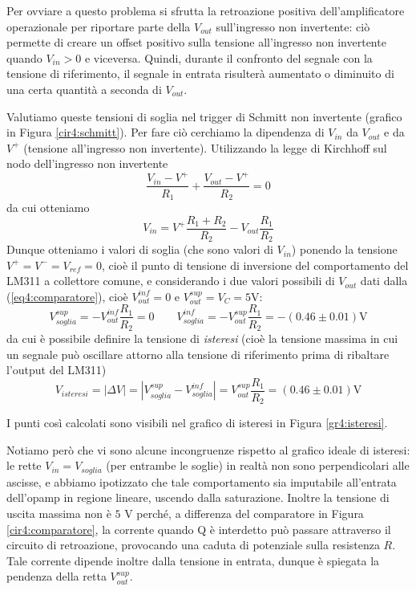 Per ovviare a questo problema si sfrutta la retroazione positiva dell'amplificatore operazionale per riportare parte della $V_{out}$ sull'ingresso non invertente: ciò permette di creare un offset positivo sulla tensione all'ingresso non invertente quando $V_{in}>0$ e viceversa.
Quindi, durante il confronto del segnale con la tensione di riferimento, il segnale in entrata risulterà aumentato o diminuito di una certa quantità a seconda di $V_{out}$.

Valutiamo queste tensioni di soglia nel trigger di Schmitt non invertente (grafico in Figura \ref{cir4:schmitt}).
Per fare ciò cerchiamo la dipendenza di $V_{in}$ da $V_{out}$ e da $V^+$ (tensione all'ingresso non invertente). Utilizzando la legge di Kirchhoff sul nodo dell'ingresso non invertente
$$\frac{V_{in}-V^+}{R_1} + \frac{V_{out}-V^+}{R_2} = 0$$
da cui otteniamo
\begin{equation}
V_{in} = V^+ \frac{R_1+R_2}{R_2} - V_{out} \frac{R_1}{R_2}
\label{eq4:v_in_parte2}
\end{equation}
Dunque otteniamo i valori di soglia (che sono valori di $V_{in}$) ponendo la tensione $V^+=V^-=V_{ref}=0$, cioè il punto di tensione di inversione del comportamento del LM311 a collettore comune, e considerando i due valori possibili di $V_{out}$ dati dalla (\ref{eq4:comparatore}), cioè $V_{out}^{inf}=0$ e $V_{out}^{sup}=V_{C}=5$\si{\volt}:
$$V_{soglia}^{sup} = - V_{out}^{inf} \frac{R_1}{R_2} = 0 \qquad V_{soglia}^{inf} = - V_{out}^{sup} \frac{R_1}{R_2} = - (0.46 \pm 0.01) \si{\volt}$$
da cui è possibile definire la tensione di \textit{isteresi} (cioè la tensione massima in cui un segnale può oscillare attorno alla tensione di riferimento prima di ribaltare l'output del LM311)
$$V_{isteresi} = |\Delta V| = |V_{soglia}^{sup} - V_{soglia}^{inf}| = V_{out}^{sup} \frac{R_1}{R_2} = (0.46 \pm 0.01) \si{\volt}$$

I punti così calcolati sono visibili nel grafico di isteresi in Figura \ref{gr4:isteresi}.

Notiamo però che vi sono alcune incongruenze rispetto al grafico ideale di isteresi: le rette $V_{in}=V_{soglia}$ (per entrambe le soglie) in realtà non sono perpendicolari alle ascisse, e abbiamo ipotizzato che tale comportamento sia imputabile all'entrata dell'opamp in regione lineare, uscendo dalla saturazione.
Inoltre la tensione di uscita massima non è $5$ \si{\volt} perché, a differenza del comparatore in Figura \ref{cir4:comparatore}, la corrente quando Q è interdetto può passare attraverso il circuito di retroazione, provocando una caduta di potenziale sulla resistenza $R$.
Tale corrente dipende inoltre dalla tensione in entrata, dunque è spiegata la pendenza della retta $V_{out}^{sup}$.

